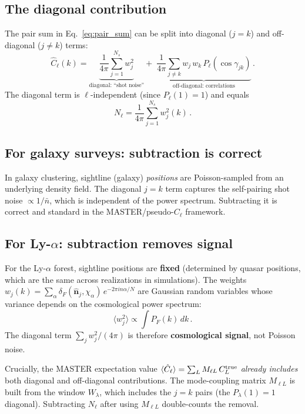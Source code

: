 \documentclass[11pt,a4paper]{article}
\newcommand{\hchi}{\hat{\bm{n}}}
\newcommand{\PF}{P_{\!F}}
\newcommand{\Cl}{\hat{C}_\ell}
\begin{document}
\subsection{The diagonal contribution}

The pair sum in Eq.~\eqref{eq:pair_sum} can be split into diagonal ($j{=}k$)
and off-diagonal ($j{\neq}k$) terms:
\begin{equation}
  \Cl(k) = \underbrace{
    \frac{1}{4\pi}\sum_{j=1}^{N_s} w_j^2
  }_{\text{diagonal: ``shot noise''}}
  +\;
  \underbrace{
    \frac{1}{4\pi}\sum_{j\neq k} w_j\,w_k\,P_\ell(\cos\gamma_{jk})
  }_{\text{off-diagonal: correlations}}\,.
  \label{eq:diagonal_split}
\end{equation}
The diagonal term is $\ell$-independent (since $P_\ell(1) = 1$) and equals
\begin{equation}
  N_\ell = \frac{1}{4\pi}\sum_{j=1}^{N_s} w_j^2(k)\,.
  \label{eq:sn_def}
\end{equation}

\subsection{For galaxy surveys: subtraction is correct}

In galaxy clustering, sightline (galaxy) \emph{positions} are Poisson-sampled
from an underlying density field.  The diagonal $j{=}k$ term captures
the self-pairing shot noise $\propto 1/\bar{n}$, which is independent of
the power spectrum.  Subtracting it is correct and standard in the
MASTER/pseudo-$C_\ell$ framework.

\subsection{For Ly-$\alpha$: subtraction removes signal}

For the Ly-$\alpha$ forest, sightline positions are \textbf{fixed} (determined
by quasar positions, which are the same across realizations in simulations).
The weights $w_j(k) = \sum_\alpha \delta_F(\hchi_j,\chi_\alpha)\,e^{-2\pi i n\alpha/N}$
are Gaussian random variables whose variance depends on the cosmological
power spectrum:
\begin{equation}
  \langle w_j^2 \rangle \propto \int \PF(k)\, dk\,.
\end{equation}
The diagonal term $\sum_j w_j^2/(4\pi)$ is therefore \textbf{cosmological
signal}, not Poisson noise.

Crucially, the MASTER expectation value
$\langle\Cl\rangle = \sum_L M_{\ell L}\, C_L^{\rm true}$
\emph{already includes} both diagonal and off-diagonal contributions.
The mode-coupling matrix $M_{\ell L}$ is built from the window $W_\lambda$,
which includes the $j{=}k$ pairs (the $P_\lambda(1) = 1$ diagonal).
Subtracting $N_\ell$ after using $M_{\ell L}$ double-counts the removal.
\end{document}
